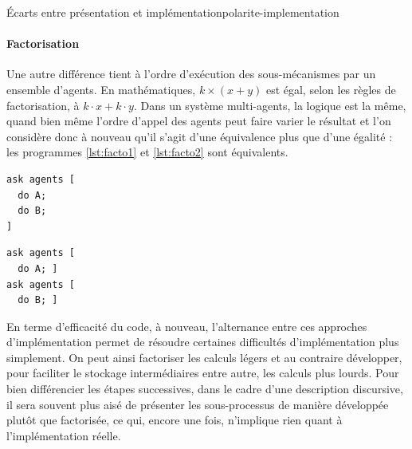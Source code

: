 \begin{encadre}{Écarts entre présentation et implémentation}{polarite-implementation}
\paragraph{Factorisation} Une autre différence tient à l'ordre d'exécution des sous-mécanismes par un ensemble d'agents.
En mathématiques, $k\times (x+y)$ est égal, selon les règles de factorisation, à $k{\cdot}x + k{\cdot}y$.
Dans un système multi-agents, la logique est la même, quand bien même l'ordre d'appel des agents peut faire varier le résultat et l'on considère donc à nouveau qu'il s'agit d'une équivalence plus que d'une égalité : les programmes \ref{lst:facto1} et \ref{lst:facto2} sont équivalents.\bigskip

\noindent\begin{minipage}[b]{.45\textwidth}
	\begin{lstlisting}[caption={Factorisé},frame=tlrb, captionpos=b, label = {lst:facto1}]
ask agents [
  do A;
  do B;
]
	\end{lstlisting}
\end{minipage}\hfill
\begin{minipage}[b]{.45\textwidth}
	\begin{lstlisting}[caption={Développé},frame=tlrb, captionpos=b, label = {lst:facto2}]
ask agents [
  do A; ]
ask agents [
  do B; ]
	\end{lstlisting}
\end{minipage}

En terme d'efficacité du code, à nouveau, l'alternance entre ces approches d'implémentation permet de résoudre certaines difficultés d'implémentation plus simplement.
On peut ainsi factoriser les calculs légers et au contraire développer, pour faciliter le stockage intermédiaires entre autre, les calculs plus lourds.
Pour bien différencier les étapes successives, dans le cadre d'une description discursive, il sera souvent plus aisé de présenter les sous-processus de manière développée plutôt que factorisée, ce qui, encore une fois, n'implique rien quant à l'implémentation réelle.


\end{encadre}
